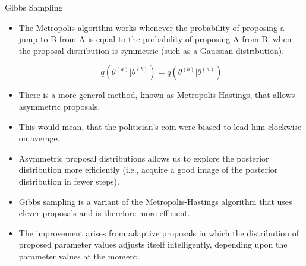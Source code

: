 \documentclass[handout]{beamer}
\begin{document}
\begin{frame}{Gibbs Sampling}
\scriptsize{

\begin{itemize}

\item The Metropolis algorithm works whenever the probability of proposing a jump to B from A is equal to the probability of proposing A from B, when the proposal distribution is symmetric (such as a Gaussian distribution).

\begin{displaymath}
q(\theta^{(a)}|\theta^{(b)}) =  q(\theta^{(b)}|\theta^{(a)})
\end{displaymath}


\item There is a more general method, known as Metropolis-Hastings, that allows asymmetric proposals.

\item This would mean, that the politician's coin were biased to lead him clockwise on average.

\item Asymmetric proposal distributions allows us to explore the posterior distribution more efficiently (i.e., acquire a good image of the posterior distribution in fewer steps).

\item Gibbs sampling is a variant of the Metropolis-Hastings algorithm that uses clever proposals and is therefore more efficient.

\item The improvement arises from adaptive proposals in which the distribution of proposed parameter values adjusts itself intelligently, depending upon the parameter values at the moment.


\end{itemize}


} 
\end{frame}
\end{document}
